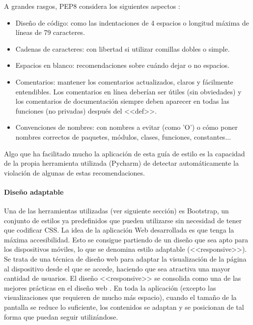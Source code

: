 A grandes rasgos, PEP8 considera los siguientes aspectos \cite{pep8}:

\begin{itemize}
	\item Diseño de código: como las indentaciones de 4 espacios o longitud
	máxima de líneas de 79 caracteres.
	\item Cadenas de caracteres: con libertad si utilizar comillas dobles o
	simple.
	\item Espacios en blanco: recomendaciones sobre cuándo dejar o no espacios.
	\item Comentarios: mantener los comentarios actualizados, claros y
	fácilmente entendibles. Los comentarios en línea deberían ser útiles (sin
	obviedades) y los comentarios de documentación siempre deben aparecer en
	todas las funciones (no privadas) después del <<def>>.
	\item Convenciones de nombres: con nombres a evitar (como 'O') o cómo poner
	nombres correctos de paquetes, módulos, clases, funciones, constantes...
\end{itemize}

Algo que ha facilitado mucho la aplicación de esta guía de estilo es la
capacidad de la propia herramienta utilizada (Pycharm) de detectar
automáticamente la violación de algunas de estas recomendaciones.

\paragraph{Diseño adaptable} Una de las herramientas utilizadas (ver siguiente
sección) es Bootstrap, un conjunto de estilos ya predefinidos que pueden
utilizarse sin necesidad de tener que codificar CSS. La idea de la aplicación
Web desarrollada es que tenga la máxima accesibilidad. Esto se consigue
partiendo de un diseño que sea apto para los dispositivos móviles, lo que se
denomina estilo adaptable (<<responsive>>). Se trata de una técnica de diseño
web para adaptar la visualización de la página al dispositivo desde el que se
accede, haciendo que sea atractiva una mayor cantidad de usuarios. El diseño
<<responsive>> se consolida como una de las mejores prácticas en el diseño web
\cite{40defiebre}. En toda la aplicación (excepto las visualizaciones que
requieren de mucho más espacio), cuando el tamaño de la pantalla se reduce lo
suficiente, los contenidos se adaptan y se posicionan de tal forma que puedan
seguir utilizándose.

